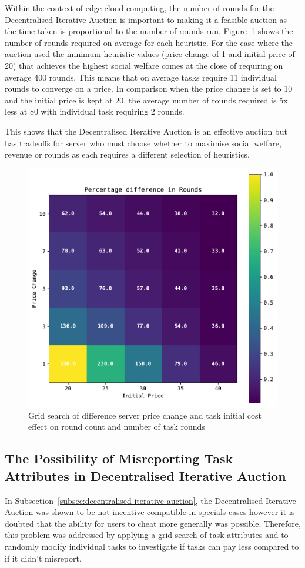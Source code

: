 Within the context of edge cloud computing, the number of rounds for the Decentralised Iterative Auction is important
to making it a feasible auction as the time taken is proportional to the number of rounds run.
Figure~\ref{fig:dia-rounds-grid-search} shows the number of rounds required on average for each heuristic. For the case where the
auction used the minimum heuristic values (price change of 1 and initial price of 20) that achieves the highest social
welfare comes at the close of requiring on average 400 rounds. This means that on average tasks require 11  %
individual rounds to converge on a price. In comparison when the price change is set to 10 and the initial price is
kept at 20, the average number of rounds required is 5x less at 80 with individual task requiring 2 rounds.

This shows that the Decentralised Iterative Auction is an effective auction but has tradeoffs for server who must
choose whether to maximise social welfare, revenue or rounds as each requires a different selection of heuristics.

\begin{figure}[h]
    \centering
    \includegraphics[width=0.45\linewidth]{figs/dia_heuristics/rounds_grid.pdf}
    \caption{Grid search of difference server price change and task initial cost effect on round count and number of
             task rounds}
    \label{fig:dia-rounds-grid-search}
\end{figure}

\subsection{The Possibility of Misreporting Task Attributes in Decentralised Iterative Auction}
\label{subsec:possibility-of-misreporting-task-attributes-in-decentarlised-iterative-auction}
In Subsection~\ref{subsec:decentralised-iterative-auction}, the Decentralised Iterative Auction was shown to be not
incentive compatible in specials cases however it is doubted that the ability for users to cheat more generally was
possible. Therefore, this problem was addressed by applying a grid search of task attributes and to randomly modify
individual tasks to investigate if tasks can pay less compared to if it didn't misreport.

